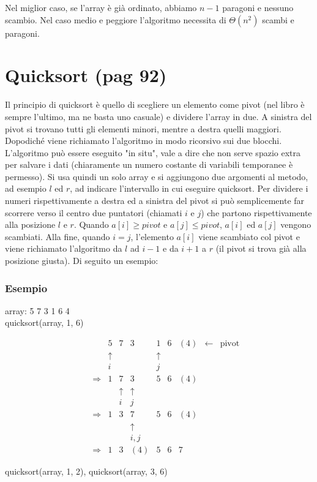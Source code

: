 \documentclass[a4paper]{book}
\begin{document}
Nel miglior caso, se l'array è già ordinato, abbiamo $n-1$ paragoni e nessuno scambio. Nel caso medio e peggiore l'algoritmo necessita di $\Theta (n^2)$ scambi e paragoni.

\section{Quicksort (pag 92)}
Il principio di quicksort è quello di scegliere un elemento come pivot (nel libro è sempre l'ultimo, ma ne basta uno casuale) e dividere l'array in due. A sinistra del pivot si trovano tutti gli elementi minori, mentre a destra quelli maggiori. Dopodiché viene richiamato l'algoritmo in modo ricorsivo sui due blocchi. L'algoritmo può essere eseguito "in situ", vale a dire che non serve spazio extra per salvare i dati (chiaramente un numero costante di variabili temporanee è permesso). Si usa quindi un solo array e si aggiungono due argomenti al metodo, ad esempio $l$ ed $r$, ad indicare l'intervallo in cui eseguire quicksort. Per dividere i numeri rispettivamente a destra ed a sinistra del pivot si può semplicemente far scorrere verso il centro due puntatori (chiamati $i$ e $j$) che partono rispettivamente alla posizione $l$ e $r$. Quando $a[i] \geq pivot$ e $a[j] \leq pivot$, $a[i]$ ed $a[j]$ vengono scambiati. Alla fine, quando $i=j$, l'elemento $a[i]$ viene scambiato col pivot e viene richiamato l'algoritmo da $l$ ad $i-1$ e da $i+1$ a $r$ (il pivot si trova già alla posizione giusta). Di seguito un esempio:
\subsubsection*{Esempio}
\begin{center}
array: 5 7 3 1 6 4\\
quicksort(array, 1, 6)
\end{center}
\[\begin{array}{*{20}{c}}
{}&{}&{}&5&7&3&1&6&{(4)}& \leftarrow &{{\text{pivot}}}\\
{}&{}&{}& \uparrow &{}&{}& \uparrow &{}&{}&{}&{}\\
{}&{}&{}&i&{}&{}&j&{}&{}&{}&{}\\
{}&{}& \Rightarrow &1&7&3&5&6&{(4)}&{}&{}\\
{}&{}&{}&{}& \uparrow & \uparrow &{}&{}&{}&{}&{}\\
{}&{}&{}&{}&i&j&{}&{}&{}&{}&{}\\
{}&{}& \Rightarrow &1&3&7&5&6&{(4)}&{}&{}\\
{}&{}&{}&{}&{}& \uparrow &{}&{}&{}&{}&{}\\
{}&{}&{}&{}&{}&{i,j}&{}&{}&{}&{}&{}\\
{}&{}& \Rightarrow &1&3&{(4)}&5&6&7&{}&{}
\end{array}\]
\begin{center}quicksort(array, 1, 2), quicksort(array, 3, 6)\end{center}
\end{document}
